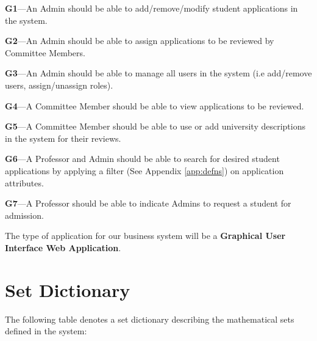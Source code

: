 \documentclass[fontsize=12pt,paper=letter,twoside]{scrartcl}
\begin{document}
\begin{mylist}

\item \textbf{G1}---An Admin should be able to add/remove/modify student applications in the system.

\item \textbf{G2}---An Admin should be able to assign applications to be reviewed by Committee Members.

\item \textbf{G3}---An Admin should be able to manage all users in the system (i.e add/remove users, assign/unassign roles).

\item \textbf{G4}---A Committee Member should be able to view applications to be reviewed.

\item \textbf{G5}---A Committee Member should be able to use or add university descriptions in the system for their reviews.

\item \textbf{G6}---A Professor and Admin should be able to search for desired student applications by applying a filter (See Appendix \ref{app:defns}) on application attributes.

\item \textbf{G7}---A Professor should be able to indicate Admins to request a student for admission.
\end{mylist}

\smallskip
\noindent The type of application for our business system will be a \textbf{Graphical User Interface Web Application}.


\newpage
\section{Set Dictionary}

The following table denotes a set dictionary describing the mathematical sets defined in the system:
\end{document}
